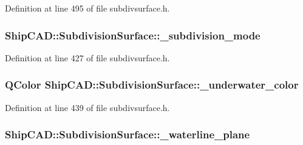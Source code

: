 Definition at line 495 of file subdivsurface.\+h.

\subsubsection[{\texorpdfstring{\+\_\+subdivision\+\_\+mode}{_subdivision_mode}}]{ Ship\+C\+A\+D\+::\+Subdivision\+Surface\+::\+\_\+subdivision\+\_\+mode\hspace{0.3cm}{\ttfamily [protected]}}\hypertarget{classShipCAD_1_1SubdivisionSurface_a0af5c881dfa24574962f42d80da997ee}{}\label{classShipCAD_1_1SubdivisionSurface_a0af5c881dfa24574962f42d80da997ee}


Definition at line 427 of file subdivsurface.\+h.

\subsubsection[{\texorpdfstring{\+\_\+underwater\+\_\+color}{_underwater_color}}]{\setlength{\rightskip}{0pt plus 5cm}Q\+Color Ship\+C\+A\+D\+::\+Subdivision\+Surface\+::\+\_\+underwater\+\_\+color\hspace{0.3cm}{\ttfamily [protected]}}\hypertarget{classShipCAD_1_1SubdivisionSurface_a8a64eabb53fa0facaa6e59579305328b}{}\label{classShipCAD_1_1SubdivisionSurface_a8a64eabb53fa0facaa6e59579305328b}


Definition at line 439 of file subdivsurface.\+h.

\subsubsection[{\texorpdfstring{\+\_\+waterline\+\_\+plane}{_waterline_plane}}]{ Ship\+C\+A\+D\+::\+Subdivision\+Surface\+::\+\_\+waterline\+\_\+plane\hspace{0.3cm}{\ttfamily [protected]}}\hypertarget{classShipCAD_1_1SubdivisionSurface_a762de21a330588c7bfbe081637cab2f3}{}\label{classShipCAD_1_1SubdivisionSurface_a762de21a330588c7bfbe081637cab2f3}


